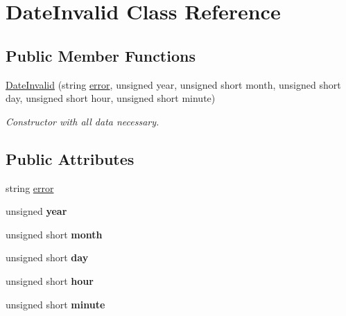 \hypertarget{class_date_invalid}{}\section{Date\+Invalid Class Reference}
\label{class_date_invalid}
\subsection*{Public Member Functions}
\begin{DoxyCompactItemize}
\item 
\hyperlink{class_date_invalid_a093a6b35b071ccd1cb368e8a161cda86}{Date\+Invalid} (string \hyperlink{class_date_invalid_a7482d7083006e3a1d362e5f0ec8fb70d}{error}, unsigned year, unsigned short month, unsigned short day, unsigned short hour, unsigned short minute)
\begin{DoxyCompactList}\small\item\em Constructor with all data necessary. \end{DoxyCompactList}\end{DoxyCompactItemize}
\subsection*{Public Attributes}
\begin{DoxyCompactItemize}
\item 
string \hyperlink{class_date_invalid_a7482d7083006e3a1d362e5f0ec8fb70d}{error}
\item 
\mbox{\label{class_date_invalid_a29e121f80a3a32e2698f21b3d8be2d40}} 
unsigned {\bfseries year}
\item 
\mbox{\label{class_date_invalid_a670452917cff3a57732593b2cb446485}} 
unsigned short {\bfseries month}
\item 
\mbox{\label{class_date_invalid_a0ff9d8bbf402f843909923816f28750a}} 
unsigned short {\bfseries day}
\item 
\mbox{\label{class_date_invalid_a902d2eb37863da18e27f6740258f224e}} 
unsigned short {\bfseries hour}
\item 
\mbox{\label{class_date_invalid_a9b2d1816919fd9cf22a02b7cd12bbb06}} 
unsigned short {\bfseries minute}
\end{DoxyCompactItemize}


